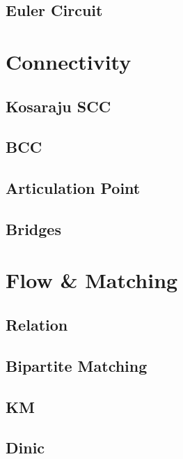     \subsection{Euler Circuit}
        

\section{Connectivity}
    \subsection{Kosaraju SCC}
        
    \subsection{BCC}
        
    \subsection{Articulation Point}
        
    \subsection{Bridges}
        

\section{Flow \& Matching}
    \subsection{Relation}
        
    \subsection{Bipartite Matching}
        
    \subsection{KM}
        
    \subsection{Dinic}
        
